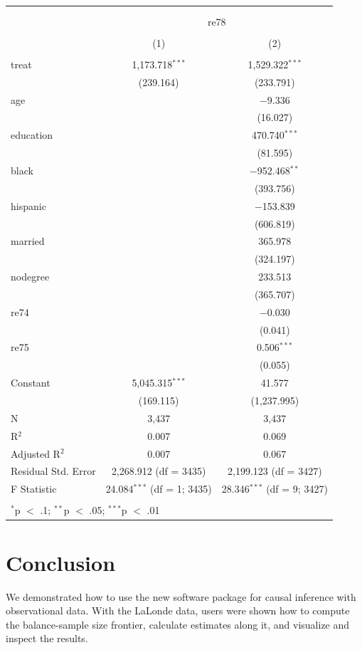 \documentclass[nojss]{jss}
\begin{document}
\begin{table}[H] \centering 
  \caption{} 
  \label{} 
\begin{tabular}{@{\extracolsep{5pt}}lcc} 
\\[-1.8ex]\hline \\[-1.8ex] 
\\[-1.8ex] & \multicolumn{2}{c}{re78} \\ 
\\[-1.8ex] & (1) & (2)\\ 
\hline \\[-1.8ex] 
 treat & 1,173.718$^{***}$ & 1,529.322$^{***}$ \\ 
  & (239.164) & (233.791) \\ 
  age &  & $-$9.336 \\ 
  &  & (16.027) \\ 
  education &  & 470.740$^{***}$ \\ 
  &  & (81.595) \\ 
  black &  & $-$952.468$^{**}$ \\ 
  &  & (393.756) \\ 
  hispanic &  & $-$153.839 \\ 
  &  & (606.819) \\ 
  married &  & 365.978 \\ 
  &  & (324.197) \\ 
  nodegree &  & 233.513 \\ 
  &  & (365.707) \\ 
  re74 &  & $-$0.030 \\ 
  &  & (0.041) \\ 
  re75 &  & 0.506$^{***}$ \\ 
  &  & (0.055) \\ 
  Constant & 5,045.315$^{***}$ & 41.577 \\ 
  & (169.115) & (1,237.995) \\ 
 N & 3,437 & 3,437 \\ 
R$^{2}$ & 0.007 & 0.069 \\ 
Adjusted R$^{2}$ & 0.007 & 0.067 \\ 
Residual Std. Error & 2,268.912 (df = 3435) & 2,199.123 (df = 3427) \\ 
F Statistic & 24.084$^{***}$ (df = 1; 3435) & 28.346$^{***}$ (df = 9; 3427) \\ 
\hline \\[-1.8ex] 
\multicolumn{3}{l}{$^{*}$p $<$ .1; $^{**}$p $<$ .05; $^{***}$p $<$ .01} \\ 
\end{tabular} 
\end{table} 


\section[Conclusion]{Conclusion}

We demonstrated how to use the new  software package
 for causal inference with observational data. With the
LaLonde data, users were shown how to compute the balance-sample size frontier,
calculate estimates along it, and visualize and inspect the results. 


\end{document}
